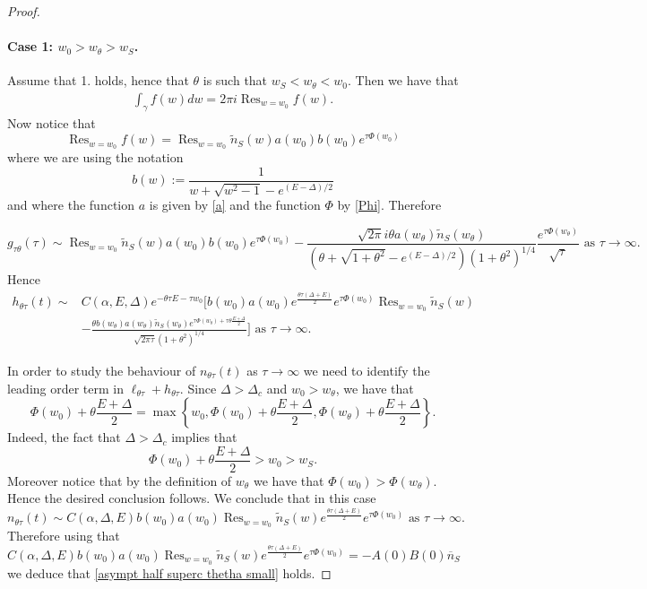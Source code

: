 \documentclass[10pt,a4paper]{amsart}
\begin{document}
\begin{proof}
\paragraph{Case 1: $w_0 > w_\theta > w_S  $.}
Assume that 1. holds, hence that $\theta $ is such that $w_S < w_\theta < w_0 $.  
Then we have that 
\begin{align*}
 \int_{\gamma}f(w) dw=  2 \pi i  \operatorname{Res}_{w=w_0} f(w).
\end{align*} 
Now notice that
\[
\operatorname{Res}_{w=w_0} f(w) = \operatorname{Res}_{w=w_0} \tilde{n}_S (w)  a(w_0) b(w_0) e^{\tau \Phi (w_0) } 
\]
where we are using the notation 
\[ 
b(w):= \frac{1}{w+\sqrt{w^2-1}-e^{(E-\Delta)/2}}
\] 
and where the function $a$ is given by \eqref{a} and the function $\Phi$ by \eqref{Phi}. 
Therefore 

\[
g_{\tau \theta } (\tau)  \sim \operatorname{Res}_{w=w_0} \tilde{n}_S (w)  a(w_0) b(w_0) e^{\tau \Phi (w_0) }  -  \frac{    \sqrt{2\pi} i \theta a(w_\theta ) \tilde{n}_S(w_\theta )}{(\theta+ \sqrt{1+ \theta^2 } - e^{(E-\Delta)/2}) (1+\theta^2)^{1/4}} \frac{ e^{ \tau \Phi(w_\theta ) }}{\sqrt{\tau}} \text{ as } \tau \to \infty. 
\]
Hence
\begin{align*}
        h_{\theta \tau } (t) \sim &C(\alpha, E, \Delta)e^{ - \theta \tau E - \tau w_0 } [   b(w_0)   a(w_0) e^{ \frac{ \theta \tau (\Delta +E) }{2}}  e^{\tau   \Phi(w_0)} \operatorname{Res}_{w=w_0} \tilde{n}_S (w) \\
        &- \frac{   \theta  b(w_\theta)   a(w_\theta ) \tilde{n}_S(w_\theta )  
        e^{ \tau \Phi(w_\theta ) + \tau\theta  \frac{E+ \Delta}{2}}
        }{\sqrt{2 \pi \tau } (1+\theta^2)^{1/4}} ]   \text{ as } \tau \to \infty. 
\end{align*}

In order to study the behaviour of  $n_{\theta \tau}(t)$ as $\tau \to \infty $ we need to identify the leading order term in $\ell_{\theta \tau}+ h_{\theta \tau}$.
Since $\Delta > \Delta_c $ and $w_0 > w_\theta  $, we have that
\[  
\Phi(w_0) + \theta\frac{E+ \Delta }{2}=\max\left\{ w_0 , \Phi(w_0) + \theta\frac{E+ \Delta }{2}, \Phi(w_\theta) + \theta \frac{E+ \Delta }{2}  \right\}. 
\] 
Indeed, the fact that $\Delta > \Delta_c $ implies that 
\[
\Phi(w_0) + \theta\frac{E+ \Delta }{2} >w_0 > w_S. 
\]
Moreover notice that by the definition of $w_\theta $ we have that  $\Phi(w_0) > \Phi(w_\theta)$. Hence the desired conclusion follows. We conclude that in this case 
\begin{equation} \label{asympt n 1b}
    n_{\theta \tau} (t) \sim C(\alpha, \Delta, E)   b(w_0) a(w_0) \operatorname{Res}_{w=w_0} \tilde{n}_S (w)e^{ \frac{ \theta \tau (\Delta + E) }{2}}  e^{\tau   \Phi(w_0)}  \text{ as } \tau \to \infty. 
\end{equation}
Therefore using that 
\[ 
C(\alpha, \Delta, E)   b(w_0) a(w_0) \operatorname{Res}_{w=w_0} \tilde{n}_S (w)e^{ \frac{ \theta \tau (\Delta + E) }{2}}  e^{\tau   \Phi(w_0)} = -  A(0) B(0) \overline{n}_S
\]
we deduce that \eqref{asympt half superc thetha small} holds. 


\end{proof}
\end{document}
